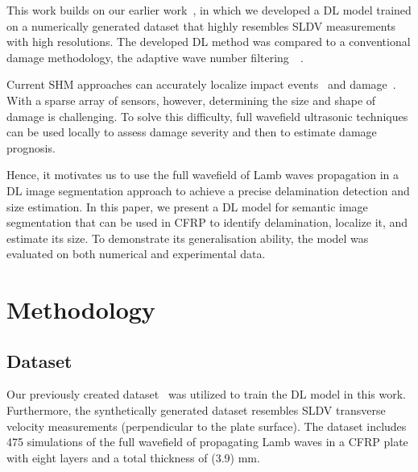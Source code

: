\documentclass[runningheads]{llncs}
\begin{document}
This work builds on our earlier work~\cite{Ijjeh2021}, in which we developed a DL model trained on a numerically generated dataset that highly resembles SLDV measurements with high resolutions.
The developed DL method was compared to a conventional damage methodology, the adaptive wave number filtering~\cite{Kudela2015}~\cite{Radzienski2019a}.

Current SHM approaches can accurately localize impact events~\cite{Ciampa2012} and damage~\cite{Nokhbatolfoghahai2020}.
With a sparse array of sensors, however, determining the size and shape of damage is challenging.
To solve this difficulty, full wavefield ultrasonic techniques can be used locally to assess damage severity and then to estimate damage prognosis.

Hence, it motivates us to use the full wavefield of Lamb waves propagation in a DL image segmentation approach to achieve a precise delamination detection and size estimation.
In this paper, we present a DL model for semantic image segmentation that can be used in CFRP to identify delamination, localize it, and estimate its size.
To demonstrate its generalisation ability, the model was evaluated on both numerical and experimental data.
\section{Methodology}
\label{methodology}
\subsection{Dataset}
Our previously created dataset~\cite{Ijjeh2021} was utilized to train the DL model in this work.
Furthermore, the synthetically generated dataset resembles SLDV transverse velocity measurements (perpendicular to the plate surface).
The dataset includes 475 simulations of the full wavefield of propagating Lamb waves in a CFRP plate with eight layers and a total thickness of (3.9) mm.
\end{document}
